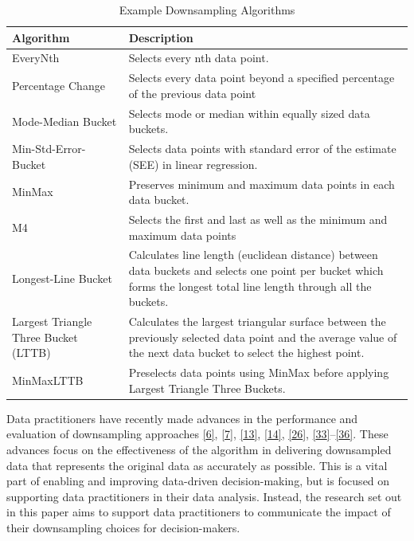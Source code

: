 \documentclass{article}
\begin{document}
\renewcommand{\arraystretch}{1.5}

\begin{table}[H]

\caption{\label{tab:unnamed-chunk-1}Example Downsampling Algorithms}
\centering
\begin{tabular}[t]{>{\raggedright\arraybackslash}p{1.8in}|>{\raggedright\arraybackslash}p{3.8in}}
\hline
Algorithm & Description\\
\hline
EveryNth & Selects every nth data point.\\
\hline
Percentage Change & Selects every data point beyond a specified percentage of the previous data point\\
\hline
Mode-Median Bucket & Selects mode or median within equally sized data buckets.\\
\hline
Min-Std-Error-Bucket & Selects data points with standard error of the estimate (SEE) in linear regression.\\
\hline
MinMax & Preserves minimum and maximum data points in each data bucket.\\
\hline
M4 & Selects the first and last as well as the minimum and maximum data points\\
\hline
Longest-Line Bucket & Calculates line length (euclidean distance) between data buckets and selects one point per bucket which forms the longest total
line length through all the buckets.\\
\hline
Largest Triangle Three Bucket (LTTB) & Calculates the largest triangular surface between the previously selected data point and the average value of the next data bucket to select the highest point.\\
\hline
MinMaxLTTB & Preselects data points using MinMax before applying Largest Triangle Three Buckets.\\
\hline
\end{tabular}
\end{table}

Data practitioners have recently made advances in the performance and
evaluation of downsampling approaches
\protect\hyperlink{ref-datapoint}{{[}6{]}},
\protect\hyperlink{ref-MinMaxLTTB}{{[}7{]}},
\protect\hyperlink{ref-downsampling}{{[}13{]}},
\protect\hyperlink{ref-sampling}{{[}14{]}},
\protect\hyperlink{ref-plotly}{{[}26{]}},
\protect\hyperlink{ref-dashql}{{[}33{]}}--\protect\hyperlink{ref-MinMaxOrdered}{{[}36{]}}.
These advances focus on the effectiveness of the algorithm in delivering
downsampled data that represents the original data as accurately as
possible. This is a vital part of enabling and improving data-driven
decision-making, but is focused on supporting data practitioners in
their data analysis. Instead, the research set out in this paper aims to
support data practitioners to communicate the impact of their
downsampling choices for decision-makers.
\end{document}
